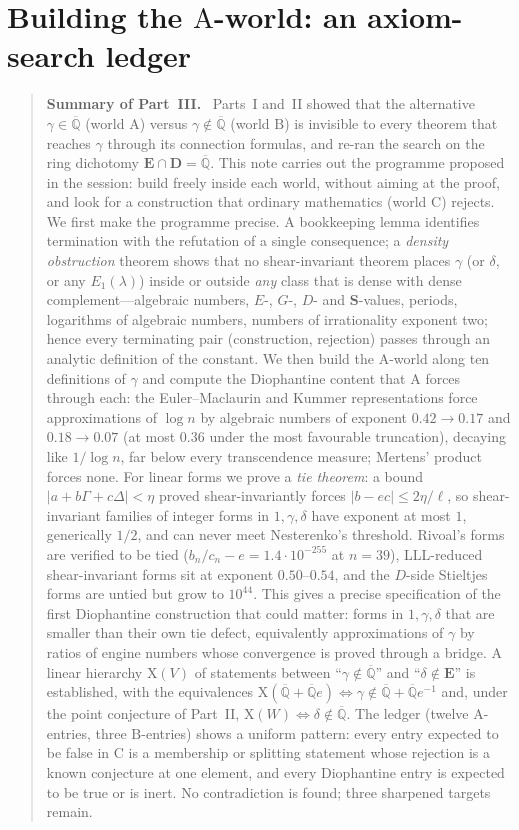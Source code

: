 \documentclass[11pt,a4paper]{article}
\newcommand{\Qbar}{\overline{\mathbb Q}}
\newcommand{\EE}{\mathbf E}
\newcommand{\DD}{\mathbf D}
\newcommand{\Sring}{\mathbf S}
\theoremstyle{definition}
\theoremstyle{remark}
\numberwithin{equation}{section}
\newenvironment{partsummary}[1]{\begin{quotation}\small\noindent\textbf{Summary of Part~#1.}\ }{\end{quotation}}
\begin{document}
\part{Building the $\mathrm A$-world: an axiom-search ledger}
\begin{partsummary}{III}
Parts~I and~II showed that the alternative $\gamma\in\Qbar$ (world $\mathrm A$) versus
$\gamma\notin\Qbar$ (world $\mathrm B$) is invisible to every theorem that reaches $\gamma$
through its connection formulas, and re-ran the search on the ring dichotomy
$\EE\cap\DD=\Qbar$. This note carries out the programme proposed in the session: build
freely inside each world, without aiming at the proof, and look for a construction that
ordinary mathematics (world $\mathrm C$) rejects. We first make the programme precise. A
bookkeeping lemma identifies termination with the refutation of a single consequence; a
\emph{density obstruction} theorem shows that no shear-invariant theorem places $\gamma$ (or
$\delta$, or any $E_1(\lambda)$) inside or outside \emph{any} class that is dense with dense
complement---algebraic numbers, $E$-, $G$-, $D$- and $\Sring$-values, periods, logarithms of
algebraic numbers, numbers of irrationality exponent two; hence every terminating pair
(construction, rejection) passes through an analytic definition of the constant. We then
build the $\mathrm A$-world along ten definitions of $\gamma$ and compute the Diophantine
content that $\mathrm A$ forces through each: the Euler--Maclaurin and Kummer
representations force approximations of $\log n$ by algebraic numbers of exponent
$0.42\to0.17$ and $0.18\to0.07$ (at most $0.36$ under the most favourable truncation),
decaying like $1/\log n$, far below every transcendence measure; Mertens' product forces
none. For linear forms we prove a \emph{tie theorem}: a
bound $|a+b\Gamma+c\Delta|<\eta$ proved shear-invariantly forces $|b-ec|\le2\eta/\ell$,
so shear-invariant families of integer forms in $1,\gamma,\delta$ have exponent at most
$1$, generically $1/2$, and can never meet Nesterenko's threshold. Rivoal's forms are
verified to be tied ($b_n/c_n-e=1.4\cdot10^{-255}$ at $n=39$), LLL-reduced
shear-invariant forms sit at exponent $0.50$--$0.54$, and the $D$-side Stieltjes forms
are untied but grow to $10^{44}$. This gives a precise specification of the first
Diophantine construction that could matter: forms in $1,\gamma,\delta$ that are smaller
than their own tie defect, equivalently approximations of $\gamma$ by ratios of engine
numbers whose convergence is proved through a bridge. A linear hierarchy
$\mathrm X(V)$ of statements between ``$\gamma\notin\Qbar$'' and ``$\delta\notin\EE$'' is
established, with the equivalences $\mathrm X(\Qbar+\Qbar e)\Leftrightarrow
\gamma\notin\Qbar+\Qbar e^{-1}$ and, under the point conjecture of Part~II,
$\mathrm X(W)\Leftrightarrow\delta\notin\Qbar$. The ledger (twelve $\mathrm A$-entries,
three $\mathrm B$-entries) shows a uniform pattern: every entry expected to be false in
$\mathrm C$ is a membership or splitting statement whose rejection is a known conjecture
at one element, and every Diophantine entry is expected to be true or is inert. No
contradiction is found; three sharpened targets remain.
\end{partsummary}
\end{document}
